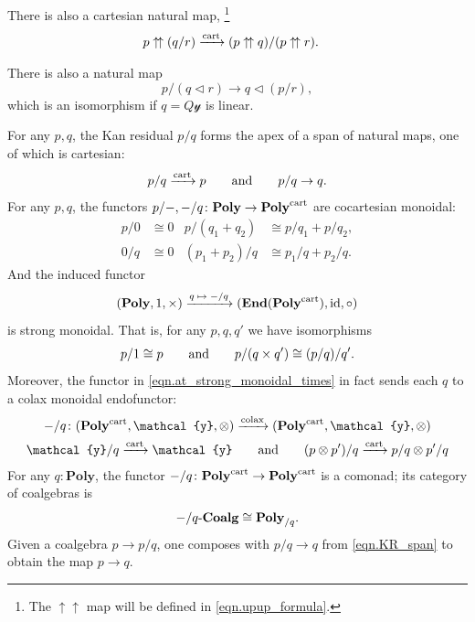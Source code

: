 \documentclass[11pt, one side, article]{memoir}
\theoremstyle{definition}
\theoremstyle{plain}
\newcommand{\Cat}[1]{\mathbf{#1}}%
\newcommand{\id}{\mathrm{id}}
\newcommand{\To}[2][]{\xrightarrow[#1]{\tn{$#2$}}}
\newcommand{\tn}[1]{\textnormal{#1}}
\newcommand{\End}{\Cat{End}}
\newcommand{\yon}{{\mathcal{y}}}
\newcommand{\poly}{\Cat{Poly}}
\newcommand{\cart}{\tn{cart}}
\newcommand{\tocart}{\To{\cart}}
\newcommand{\polycart}{\poly^\cart}
\newcommand{\0}{\textsf{0}}
\newcommand{\1}{\tn{\textsf{1}}}
\newcommand{\tri}{\mathbin{\triangleleft}}
\newcommand{\at}[2]{#1/#2}
\newcommand{\upup}{\uparrow\!\uparrow}
\newcommand{\hh}[2][]{#1 \tn{#2} #1}
\newcommand{\qqand}{\hh[\qquad]{and}}
\newcommand{\coalg}{\tn{-}\Cat{Coalg}}
\begin{document}
There is also a cartesian natural map,%
\footnote{The $\upup$ map will be defined in \eqref{eqn.upup_formula}.}
\begin{align}
  p\upup(\at{q}{r})&\tocart\at{(p\upup q)}{(p\upup r)}.
 \end{align}

There is also a natural map
\begin{equation}
	\at{p}{(q\tri r)}\to q\tri(\at{p}{r}),
\end{equation}
which is an isomorphism if $q=Q\yon$ is linear.

For any $p,q$, the Kan residual $\at{p}{q}$ forms the apex of a span of natural maps, one of which is cartesian:
\begin{equation}\label{eqn.KR_span}
  \at{p}{q}\tocart p
  \qqand
  \at{p}{q}\to q.
\end{equation}
For any $p,q$, the functors $\at{p}{-},\at{-}{q}\colon\poly\to\polycart$ are cocartesian monoidal:
\begin{align}
\label{eqn.at_add}
\at{p}{0}&\cong 0
&
\at{p}{(q_1+q_2)}&\cong \at{p}{q_1}+\at{p}{q_2},\\
\at{0}{q}&\cong 0
&\label{eqn.at_add2}
\at{(p_1+p_2)}{q}&\cong \at{p_1}{q}+\at{p_2}{q}.
\end{align}
And the induced functor 
\begin{equation}\label{eqn.at_strong_monoidal_times}
(\poly,1,\times)\To{q\mapsto\at{-}{q}}(\End(\polycart),\id,\circ)
\end{equation}
is strong monoidal. That is, for any $p,q,q'$ we have isomorphisms
\begin{equation}\label{eqn.at_p_1}
	\at{p}{1}\cong p
	\qqand
	\at{p}{( q\times q')}\cong \at{(\at{p}{q})}{q'}.
\end{equation}
Moreover, the functor in \eqref{eqn.at_strong_monoidal_times} in fact sends each $q$ to a colax monoidal endofunctor:
\begin{gather}
	\at{-}{q}\colon(\polycart,\yon,\otimes)\To{\tn{colax}}(\polycart,\yon,\otimes)\\
	\at{\yon}{q}\tocart\yon
	\qqand
	\at{(p\otimes p')}{q}\tocart\at{p}{q}\otimes\at{p'}{q}
\end{gather}
For any $q:\poly$, the functor $\at{-}{q}\colon\polycart\to\polycart$ is a comonad; its category of coalgebras is
\begin{equation}\label{eqn.at_q_coalg_poly_over_q}
	\at{-}{q}\coalg\cong\poly_{/q}.
\end{equation}
Given a coalgebra $p\to\at{p}{q}$, one composes with $\at{p}{q}\to q$ from \eqref{eqn.KR_span} to obtain the map $p\to q$.
\end{document}
